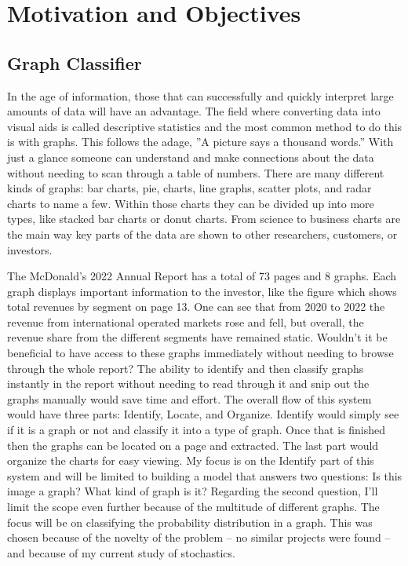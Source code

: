 \documentclass[12pt]{article}
\begin{document}
    \hypertarget{Table of Contents}{\tableofcontents}

    \newpage

    \newpage \section{Motivation and Objectives} 
    
        \subsection{Graph Classifier}
            
            In the age of information, those that can successfully and quickly interpret large amounts of data will have an advantage. 
            The field where converting data into visual aids is called descriptive statistics
            and the most common method to do this is with graphs. 
            This follows the adage, ''A picture says a thousand words.'' 
            With just a glance someone can understand and make connections about the data without needing to scan through a table of numbers. 
            There are many different kinds of graphs: bar charts, pie, charts, line graphs, scatter plots, 
            and radar charts to name a few. Within those charts they can be divided up into more types, 
            like stacked bar charts or donut charts. 
            From science to business charts are the main way key parts of the data are shown to other researchers, customers, or investors. 

            The McDonald’s 2022 Annual Report \cite{mcdonalds2022} has a total of 73 pages and 8 graphs. 
            Each graph displays important information to the investor, like the figure which shows total revenues by segment on page 13. 
            One can see that from 2020 to 2022 the revenue from international operated markets rose and fell, but overall, 
            the revenue share from the different segments have remained static. 
            Wouldn’t it be beneficial to have access to these graphs immediately without needing to browse through the whole report? 
            The ability to identify and then classify graphs instantly in the report without needing to read through it 
            and snip out the graphs manually would save time and effort. The overall flow of this system would have three parts: 
            Identify, Locate, and Organize. Identify would simply see if it is a graph or not and classify it into a type of graph. 
            Once that is finished then the graphs can be located on a page and extracted. 
            The last part would organize the charts for easy viewing. My focus is on the Identify part of this system and will be limited to building a model that answers two questions: Is this image a graph? What kind of graph is it? Regarding the second question, I’ll limit the scope even further because of the multitude of different graphs. The focus will be on classifying the probability distribution in a graph. This was chosen because of the novelty of the problem – no similar projects were found – and because of my current study of stochastics.
        
\end{document}
